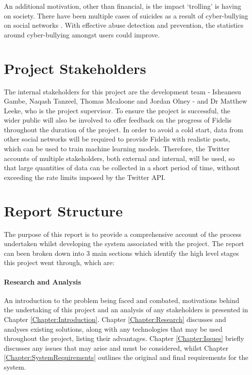 An additional motivation, other than financial, is the impact `trolling' is having on society. There have been multiple cases of suicides as a result of cyber-bullying on social networks \cite{NoBullying:Cyber}. With effective abuse detection and prevention, the statistics around cyber-bullying amongst users could improve.

\section{Project Stakeholders}
The internal stakeholders for this project are the development team - Isheanesu Gambe, Naqash Tanzeel, Thomas Mcaloone and Jordan Olney - and Dr Matthew Leeke, who is the project supervisor. To ensure the project is successful, the wider public will also be involved to offer feedback on the progress of Fidelis throughout the duration of the project. In order to avoid a cold start, data from other social networks will be required to provide Fidelis with realistic posts, which can be used to train machine learning models. Therefore, the Twitter accounts of multiple stakeholders, both external and internal, will be used, so that large quantities of data can be collected in a short period of time, without exceeding the rate limits imposed by the Twitter API.

\section{Report Structure}
The purpose of this report is to provide a comprehensive account of the process undertaken whilst developing the system associated with the project. The report can been broken down into 3 main sections which identify the high level stages this project went through, which are:

\paragraph{Research and Analysis}
An introduction to the problem being faced and combated, motivations behind the undertaking of this project and an analysis of any stakeholders is presented in Chapter \ref{Chapter:Introduction}. Chapter \ref{Chapter:Research} discusses and analyses existing solutions, along with any technologies that may be used throughout the project, listing their advantages. Chapter \ref{Chapter:Issues} briefly discusses any issues that may arise and must be considered, whilst Chapter \ref{Chapter:SystemRequirements} outlines the original and final requirements for the system.

